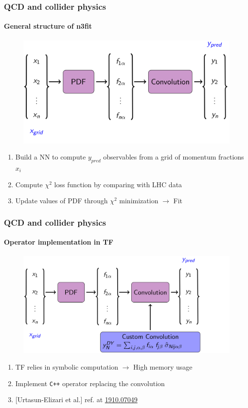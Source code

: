 \documentclass[aspectratio=43]{beamer}
\begin{document}
\begin{frame}
	
	\frametitle{QCD and collider physics}
	\framesubtitle{General structure of n3fit}
	
	\footnotesize
	
	\begin{figure}
		\includegraphics[width = 9 cm]{plots/backup/n3fit1.png}
	\end{figure}	
	
	\begin{enumerate}
		\item Build a NN to compute $y_{pred}$ observables from a grid of momentum fractions $x_{i}$
		\item Compute $\chi^{2}$ loss function by comparing with LHC data
		\item Update values of PDF through $\chi^{2}$ minimization $\longrightarrow$ {\color{violet} Fit}
	\end{enumerate}
	
	\end{frame}

\begin{frame}
	
	\frametitle{QCD and collider physics}
	\framesubtitle{Operator implementation in TF}
	
	\footnotesize
	
	\begin{figure}
	\includegraphics[width = 10.5 cm]{plots/backup/n3fit2.png}
	\end{figure}
	
	\begin{enumerate}
	\item TF relies in symbolic computation $\longrightarrow$ High memory usage
	\item Implement \texttt{C++} operator replacing the convolution
	\item {\color{blue}[Urtasun-Elizari et al.]} ref. at {\color{blue} \href{https://arxiv.org/abs/1910.07049}{1910.07049}}
\end{enumerate}

\end{frame}
\end{document}
